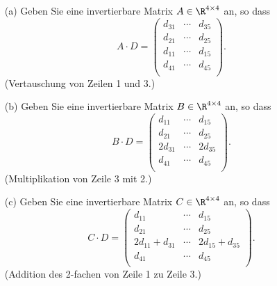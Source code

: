 \begin{itemize}
	\item[(a)] Geben Sie eine invertierbare Matrix $A\in\R^{4\times 4}$ an, so dass
			$$
				A\cdot D = 
				\begin{pmatrix}
					d_{31}	&\cdots	&d_{35}\\
					d_{21}	&\cdots	&d_{25}\\		
					d_{11}	&\cdots	&d_{15}\\
					d_{41}	&\cdots	&d_{45}\\
				\end{pmatrix}.
			$$
			(Vertauschung von Zeilen 1 und 3.)
	\item[(b)] Geben Sie eine invertierbare Matrix $B\in\R^{4\times 4}$ an, so dass
			$$
				B\cdot D = 
				\begin{pmatrix}
					d_{11} 			&\cdots	&d_{15} \\
					d_{21}			&\cdots	&d_{25}\\		
					2d_{31}			&\cdots	&2d_{35}\\
					d_{41}			&\cdots	&d_{45}\\
				\end{pmatrix}.
			$$
			(Multiplikation von Zeile 3 mit 2.)
	\item[(c)] Geben Sie eine invertierbare Matrix $C\in\R^{4\times 4}$ an, so dass
			$$
				C\cdot D = 
				\begin{pmatrix}
					d_{11} 			&\cdots	&d_{15} \\
					d_{21}			&\cdots	&d_{25}\\		
					2d_{11} + d_{31}	&\cdots	&2d_{15} + d_{35}\\
					d_{41}			&\cdots	&d_{45}\\
				\end{pmatrix}.
			$$
			(Addition des 2-fachen von Zeile 1 zu Zeile 3.)
\end{itemize}
\quad

